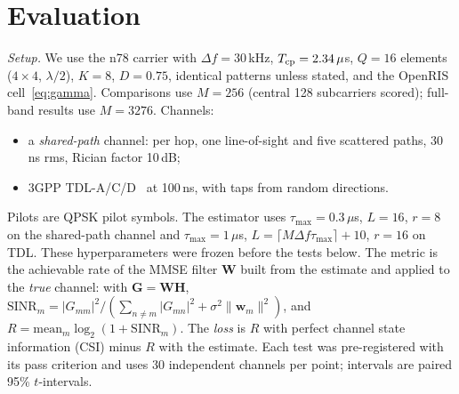 \documentclass[conference,10pt]{IEEEtran}
\theoremstyle{remark}
\begin{document}
\section{Evaluation}\label{sec:eval}
\emph{Setup.} We use the n78 carrier with $\Delta f=30$\,kHz, $T_{\rm cp}=2.34\,\mu$s, $Q=16$ elements ($4\times4$,
$\lambda/2$), $K=8$, $D=0.75$, identical patterns unless stated, and the OpenRIS cell~\eqref{eq:gamma}. Comparisons use
$M=256$ (central 128 subcarriers scored); full-band results use $M=3276$. Channels:
\begin{itemize}
\item a \emph{shared-path} channel: per hop, one line-of-sight and five scattered paths, 30\,ns rms, Rician factor 10\,dB;
\item 3GPP TDL-A/C/D~\cite{tr38901} at 100\,ns, with taps from random directions.
\end{itemize}
Pilots are QPSK pilot symbols. The estimator uses $\tau_{\max}=0.3\,\mu$s, $L=16$, $r=8$ on the shared-path channel and
$\tau_{\max}=1\,\mu$s, $L=\lceil M\Delta f\tau_{\max}\rceil+10$, $r=16$ on TDL. These hyperparameters were frozen before
the tests below. The metric is the achievable rate of the MMSE filter $\bm W$ built from the estimate and applied to the
\emph{true} channel: with $\bm G=\bm W\bm H$, $\mathrm{SINR}_m=|G_{mm}|^2/(\sum_{n\ne m}|G_{mn}|^2+\sigma^2\|\bm w_m\|^2)$,
and $R=\mathrm{mean}_m\log_2(1+\mathrm{SINR}_m)$. The \emph{loss} is $R$ with perfect channel state information (CSI)
minus $R$ with the estimate. Each test was pre-registered with its pass criterion and uses 30 independent channels per
point; intervals are paired 95\% $t$-intervals.
\end{document}

